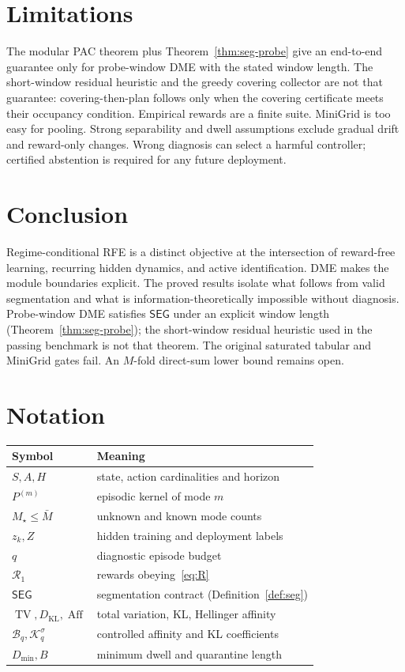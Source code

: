 \documentclass[11pt]{article}
\newcommand{\Rone}{\mathcal{R}_1}
\newcommand{\Aff}{\operatorname{Aff}}
\newcommand{\TV}{\operatorname{TV}}
\newcommand{\KL}{D_{\mathrm{KL}}}
\newcommand{\SEG}{\mathsf{SEG}}
\newcommand{\DME}{\textsc{DME}}
\begin{document}
\section{Limitations}
\label{sec:limit}
The modular PAC theorem plus Theorem~\ref{thm:seg-probe} give an end-to-end
guarantee only for probe-window \DME{} with the stated window length. The
short-window residual heuristic and the greedy covering collector are not
that guarantee: covering-then-plan follows \citet{jin2020rewardfree} only
when the covering certificate meets their occupancy condition. Empirical
rewards are a finite suite. MiniGrid is too easy for pooling. Strong
separability and dwell assumptions exclude gradual drift and reward-only
changes. Wrong diagnosis can select a harmful controller; certified
abstention is required for any future deployment.

\section{Conclusion}
\label{sec:conc}
Regime-conditional RFE is a distinct objective at the intersection of
reward-free learning, recurring hidden dynamics, and active identification.
\DME{} makes the module boundaries explicit. The proved results isolate what
follows from valid segmentation and what is information-theoretically
impossible without diagnosis. Probe-window \DME{} satisfies $\SEG$ under an
explicit window length (Theorem~\ref{thm:seg-probe}); the short-window
residual heuristic used in the passing benchmark is not that theorem. The
original saturated tabular and MiniGrid gates fail. An $M$-fold direct-sum
lower bound remains open.

\appendix
\section{Notation}
\label{app:notation}
\begin{center}
\begin{tabular}{ll}
\toprule
Symbol & Meaning \\
\midrule
$S,A,H$ & state, action cardinalities and horizon \\
$P^{(m)}$ & episodic kernel of mode $m$ \\
$M_\star\le\bar M$ & unknown and known mode counts \\
$z_k,Z$ & hidden training and deployment labels \\
$q$ & diagnostic episode budget \\
$\Rone$ & rewards obeying~\eqref{eq:R} \\
$\SEG$ & segmentation contract (Definition~\ref{def:seg}) \\
$\TV,\KL,\Aff$ & total variation, KL, Hellinger affinity \\
$\mathcal{B}_q,\mathcal{K}_q^\sigma$ & controlled affinity and KL coefficients \\
$D_{\min},B$ & minimum dwell and quarantine length \\
\bottomrule
\end{tabular}
\end{center}
\end{document}
